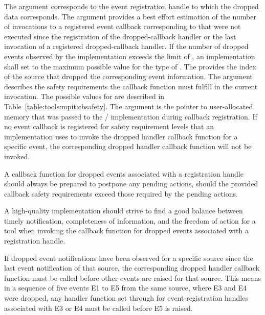 The argument  corresponds to the event
registration handle to which the dropped data corresponds. The argument
 provides a best effort estimation of the number of
invocations to a registered event callback corresponding to
 that were not executed since the registration
of the dropped-callback handler or the last invocation of a registered 
dropped-callback handler.  If the number of dropped events observed by the
implementation exceeds the limit of , an
implementation shall set  to the maximum possible value for the type of .  The
 provides the index of the source that dropped the
corresponding event information. The argument  describes
the safety requirements the callback function must fulfill in the current
invocation.  The possible values for  are described in
Table~\ref{table:tools:mpit:cbsafety}. The argument  is
the pointer to user-allocated memory that was passed to the \MPI/
implementation during callback registration.  If no event callback is
registered for safety requirement levels that an implementation uses to invoke
the dropped handler callback function for a specific event, the corresponding
dropped handler callback function will not be invoked.

\begin{users}
    A callback function for dropped events associated with a registration
    handle should always be prepared to postpone any pending actions,
    should the provided callback safety requirements exceed those required
    by the pending actions.
\end{users}

\begin{implementors}
    A high-quality implementation should strive to find a good balance between
    timely notification, completeness of information, and the freedom of action
    for a tool when invoking the callback function for dropped events associated
    with a registration handle.
\end{implementors}

If dropped event notifications have been observed for a specific source since the last
event notification of that source, the corresponding dropped handler
callback function must be called before other events are raised for
that source. This means in a sequence of five events E1 to E5 from the same
source, where E3 and E4 were dropped, any handler function set through
 for event-registration
handles associated with E3 or E4 must be called before E5 is raised.


